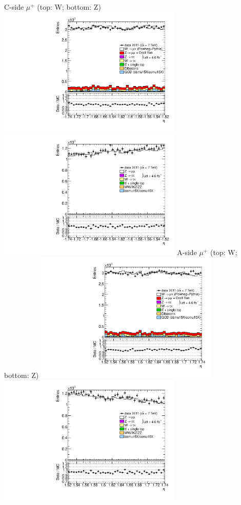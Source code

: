  {
\colb[T]
C-side $\mu^{+}$ (top: W; bottom: Z)
\centering
\includegraphics[width=0.66\textwidth]{dates/20130306/figures/both/WpDtoH_8_C_stack_l_eta_POS} \\
\includegraphics[width=0.66\textwidth]{dates/20130306/figures/both/Z_8_C_stack_lP_eta_ALL.pdf}
A-side $\mu^{+}$ (top: W; bottom: Z)
\centering
\includegraphics[width=0.66\textwidth]{dates/20130306/figures/both/WpDtoH_8_A_stack_l_eta_POS} \\
\includegraphics[width=0.66\textwidth]{dates/20130306/figures/both/Z_8_A_stack_lP_eta_ALL.pdf} 
\cole
}

